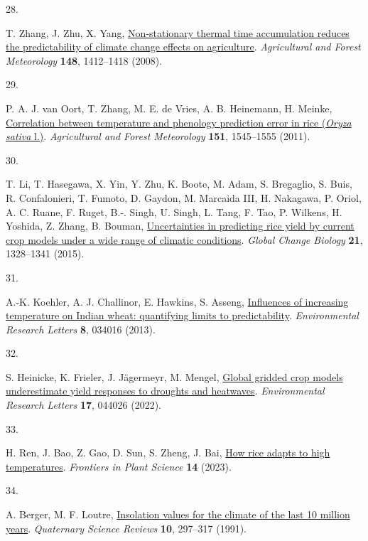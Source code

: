 \documentclass[
  letterpaper,
  DIV=11,
  numbers=noendperiod]{scrartcl}
\newlength{\cslhangindent}
\newlength{\csllabelwidth}
\newenvironment{CSLReferences}[2] %
 {\begin{list}{}{%
  \setlength{\itemindent}{0pt}
  \setlength{\leftmargin}{0pt}
  \setlength{\parsep}{0pt}
  \ifodd #1
   \setlength{\leftmargin}{\cslhangindent}
   \setlength{\itemindent}{-1\cslhangindent}
  \fi
  \setlength{\itemsep}{#2\baselineskip}}}
 {\end{list}}
\newcommand{\CSLLeftMargin}[1]{\parbox[t]{\csllabelwidth}{\strut#1\strut}}
\newcommand{\CSLRightInline}[1]{\parbox[t]{\linewidth - \csllabelwidth}{\strut#1\strut}}
\begin{document}
\begin{CSLReferences}{0}{1}
\CSLLeftMargin{28. }%
\CSLRightInline{T. Zhang, J. Zhu, X. Yang,
\href{https://doi.org/10.1016/j.agrformet.2008.04.007}{Non-stationary
thermal time accumulation reduces the predictability of climate change
effects on agriculture}. \emph{Agricultural and Forest Meteorology}
\textbf{148}, 1412--1418 (2008).}

\CSLLeftMargin{29. }%
\CSLRightInline{P. A. J. van Oort, T. Zhang, M. E. de Vries, A. B.
Heinemann, H. Meinke,
\href{https://doi.org/10.1016/j.agrformet.2011.06.012}{Correlation
between temperature and phenology prediction error in rice ({\emph{Oryza
sativa}} l.)}. \emph{Agricultural and Forest Meteorology} \textbf{151},
1545--1555 (2011).}

\CSLLeftMargin{30. }%
\CSLRightInline{T. Li, T. Hasegawa, X. Yin, Y. Zhu, K. Boote, M. Adam,
S. Bregaglio, S. Buis, R. Confalonieri, T. Fumoto, D. Gaydon, M.
Marcaida III, H. Nakagawa, P. Oriol, A. C. Ruane, F. Ruget, B.-. Singh,
U. Singh, L. Tang, F. Tao, P. Wilkens, H. Yoshida, Z. Zhang, B. Bouman,
\href{https://doi.org/10.1111/gcb.12758}{Uncertainties in predicting
rice yield by current crop models under a wide range of climatic
conditions}. \emph{Global Change Biology} \textbf{21}, 1328--1341
(2015).}

\CSLLeftMargin{31. }%
\CSLRightInline{A.-K. Koehler, A. J. Challinor, E. Hawkins, S. Asseng,
\href{https://doi.org/10.1088/1748-9326/8/3/034016}{Influences of
increasing temperature on Indian wheat: quantifying limits to
predictability}. \emph{Environmental Research Letters} \textbf{8},
034016 (2013).}

\CSLLeftMargin{32. }%
\CSLRightInline{S. Heinicke, K. Frieler, J. Jägermeyr, M. Mengel,
\href{https://doi.org/10.1088/1748-9326/ac592e}{Global gridded crop
models underestimate yield responses to droughts and heatwaves}.
\emph{Environmental Research Letters} \textbf{17}, 044026 (2022).}

\CSLLeftMargin{33. }%
\CSLRightInline{H. Ren, J. Bao, Z. Gao, D. Sun, S. Zheng, J. Bai,
\href{https://doi.org/10.3389/fpls.2023.1137923}{How rice adapts to high
temperatures}. \emph{Frontiers in Plant Science} \textbf{14} (2023).}

\CSLLeftMargin{34. }%
\CSLRightInline{A. Berger, M. F. Loutre,
\href{https://doi.org/10.1016/0277-3791(91)90033-Q}{Insolation values
for the climate of the last 10 million years}. \emph{Quaternary Science
Reviews} \textbf{10}, 297--317 (1991).}


\end{CSLReferences}
\end{document}
